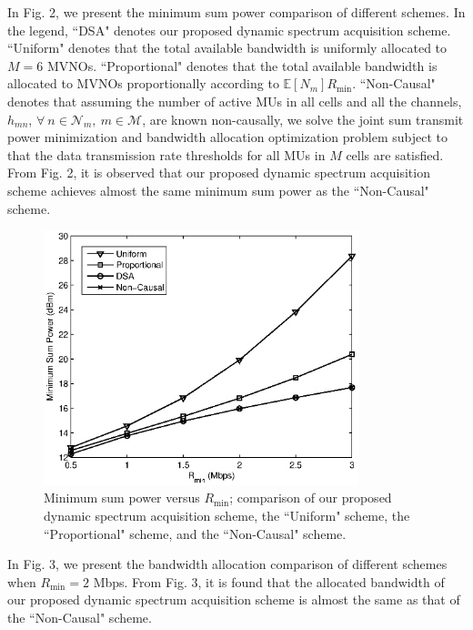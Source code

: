 \documentclass[journal]{IEEEtran}
\begin{document}
In Fig. 2, we present the minimum sum power comparison of different schemes. In the legend, ``DSA" denotes our proposed dynamic spectrum acquisition scheme. ``Uniform" denotes that the total available bandwidth is uniformly allocated to $M=6$ MVNOs. ``Proportional" denotes that the total available bandwidth is allocated to MVNOs proportionally according to $\mathbb{E}[N_m]R_{\min}$. ``Non-Causal" denotes that assuming the number of active MUs in all cells and all the channels, $h_{mn}$, $\forall\ n\in\mathcal{N}_m,\ m\in\mathcal{M}$, are known non-causally, we solve the joint sum transmit power minimization and bandwidth allocation optimization problem subject to that the data transmission rate thresholds for all MUs in $M$ cells are satisfied. From Fig. 2, it is observed that our proposed dynamic spectrum acquisition scheme achieves almost the same minimum sum power as the ``Non-Causal" scheme.

\begin{figure}
\centering
\includegraphics[width=3.6in]{fig2.eps}
\caption{Minimum sum power versus $R_{\min}$; comparison of our proposed dynamic spectrum acquisition scheme, the ``Uniform" scheme, the ``Proportional" scheme, and the ``Non-Causal" scheme.}
\end{figure}

In Fig. 3, we present the bandwidth allocation comparison of different schemes when $R_{\min}=2$ Mbps. From Fig. 3, it is found that the allocated bandwidth of our proposed dynamic spectrum acquisition scheme is almost the same as that of the ``Non-Causal" scheme.
\end{document}
